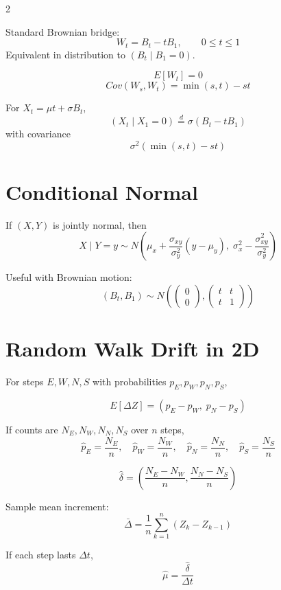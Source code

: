 \documentclass[10pt]{article}
\begin{document}
\begin{multicols}{2}
\begin{definitionbox}
Standard Brownian bridge:
\[
W_t=B_t-tB_1,\qquad 0\le t\le 1
\]
Equivalent in distribution to \((B_t\mid B_1=0)\).
\end{definitionbox}

\[
E[W_t]=0
\]
\[
Cov(W_s,W_t)=\min(s,t)-st
\]

For \(X_t=\mu t+\sigma B_t\),
\[
(X_t\mid X_1=0)\overset{d}= \sigma(B_t-tB_1)
\]
with covariance
\[
\sigma^2(\min(s,t)-st)
\]

\section{Conditional Normal}

\begin{formulabox}
If \((X,Y)\) is jointly normal, then
\[
X\mid Y=y \sim
N\left(
\mu_x+\frac{\sigma_{xy}}{\sigma_y^2}(y-\mu_y),
\;
\sigma_x^2-\frac{\sigma_{xy}^2}{\sigma_y^2}
\right)
\]
\end{formulabox}

Useful with Brownian motion:
\[
(B_t,B_1)\sim N\!\left(
\begin{pmatrix}0\\0\end{pmatrix},
\begin{pmatrix}t&t\\ t&1\end{pmatrix}
\right)
\]

\section{Random Walk Drift in 2D}

For steps \(E,W,N,S\) with probabilities \(p_E,p_W,p_N,p_S\),

\begin{formulabox}
\[
E[\Delta Z]=(p_E-p_W,\; p_N-p_S)
\]
\end{formulabox}

If counts are \(N_E,N_W,N_N,N_S\) over \(n\) steps,
\[
\hat p_E=\frac{N_E}{n},\quad
\hat p_W=\frac{N_W}{n},\quad
\hat p_N=\frac{N_N}{n},\quad
\hat p_S=\frac{N_S}{n}
\]

\[
\hat\delta=
\left(
\frac{N_E-N_W}{n},
\frac{N_N-N_S}{n}
\right)
\]

Sample mean increment:
\[
\bar\Delta=\frac1n\sum_{k=1}^n (Z_k-Z_{k-1})
\]

If each step lasts \(\Delta t\),
\[
\hat\mu=\frac{\hat\delta}{\Delta t}
\]


\end{multicols}
\end{document}
